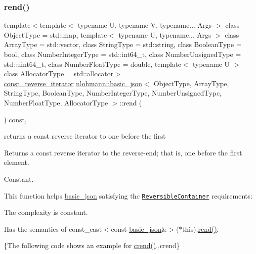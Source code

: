 \subsubsection{\texorpdfstring{rend()}{rend()}\hspace{0.1cm}{\footnotesize\ttfamily [2/2]}}
{\footnotesize\ttfamily template$<$template$<$ typename U, typename V, typename... Args $>$ class Object\+Type = std\+::map, template$<$ typename U, typename... Args $>$ class Array\+Type = std\+::vector, class String\+Type  = std\+::string, class Boolean\+Type  = bool, class Number\+Integer\+Type  = std\+::int64\+\_\+t, class Number\+Unsigned\+Type  = std\+::uint64\+\_\+t, class Number\+Float\+Type  = double, template$<$ typename U $>$ class Allocator\+Type = std\+::allocator$>$ \\
\hyperlink{classnlohmann_1_1basic__json_ae336fff01f4b78e3e16e5008dc8dbc00}{const\+\_\+reverse\+\_\+iterator} \hyperlink{classnlohmann_1_1basic__json}{nlohmann\+::basic\+\_\+json}$<$ Object\+Type, Array\+Type, String\+Type, Boolean\+Type, Number\+Integer\+Type, Number\+Unsigned\+Type, Number\+Float\+Type, Allocator\+Type $>$\+::rend (\begin{DoxyParamCaption}{ }\end{DoxyParamCaption}) const\hspace{0.3cm}{\ttfamily [inline]}, {\ttfamily [noexcept]}}



returns a const reverse iterator to one before the first 

Returns a const reverse iterator to the reverse-\/end; that is, one before the first element.

  Constant.

This function helps {\ttfamily \hyperlink{classnlohmann_1_1basic__json}{basic\+\_\+json}} satisfying the \href{http://en.cppreference.com/w/cpp/concept/ReversibleContainer}{\tt Reversible\+Container} requirements\+:
\begin{DoxyItemize}
\item The complexity is constant.
\item Has the semantics of {\ttfamily const\+\_\+cast$<$const \hyperlink{classnlohmann_1_1basic__json}{basic\+\_\+json}\&$>$($\ast$this).\hyperlink{classnlohmann_1_1basic__json_aaa160a960dd3dd90856a72b1d8dbe707}{rend()}}.
\end{DoxyItemize}

\{The following code shows an example for {\ttfamily \hyperlink{classnlohmann_1_1basic__json_aa7084e62b93ef0236698b246a58bb2da}{crend()}}.,crend\}


